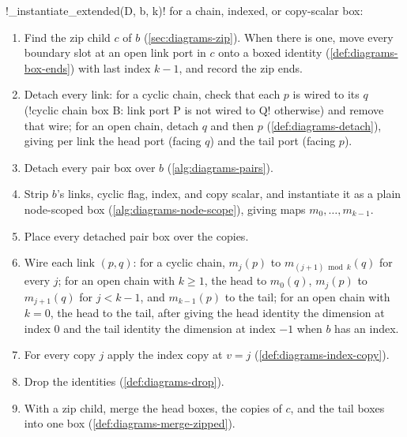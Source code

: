 \begin{algorithm}\label{alg:diagrams-extended}
\py!_instantiate_extended(D, b, k)! for a chain, indexed, or copy-scalar box:
\begin{enumerate}
\item Find the zip child $c$ of $b$ (\cref{sec:diagrams-zip}). When there is one, move every boundary slot at an open link port in $c$ onto a boxed identity (\cref{def:diagrams-box-ends}) with last index $k-1$, and record the zip ends.
\item Detach every link: for a cyclic chain, check that each $p$ is wired to its $q$ (\code!cyclic chain box B: link port P is not wired to Q! otherwise) and remove that wire; for an open chain, detach $q$ and then $p$ (\cref{def:diagrams-detach}), giving per link the head port (facing $q$) and the tail port (facing $p$).
\item Detach every pair box over $b$ (\cref{alg:diagrams-pairs}).
\item Strip $b$'s links, cyclic flag, index, and copy scalar, and instantiate it as a plain node-scoped box (\cref{alg:diagrams-node-scope}), giving maps $m_0,\dots,m_{k-1}$.
\item Place every detached pair box over the copies.
\item Wire each link $(p,q)$: for a cyclic chain, $m_j(p)$ to $m_{(j+1)\bmod k}(q)$ for every $j$; for an open chain with $k\ge 1$, the head to $m_0(q)$, $m_j(p)$ to $m_{j+1}(q)$ for $j<k-1$, and $m_{k-1}(p)$ to the tail; for an open chain with $k=0$, the head to the tail, after giving the head identity the dimension at index $0$ and the tail identity the dimension at index $-1$ when $b$ has an index.
\item For every copy $j$ apply the index copy at $v=j$ (\cref{def:diagrams-index-copy}).
\item Drop the identities (\cref{def:diagrams-drop}).
\item With a zip child, merge the head boxes, the copies of $c$, and the tail boxes into one box (\cref{def:diagrams-merge-zipped}).
\end{enumerate}
\end{algorithm}


